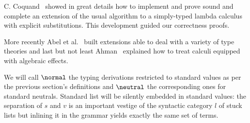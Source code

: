 C. Coquand~\cite{Coquand02} showed in great details how to implement and prove sound
and complete an extension of the usual algorithm to a simply-typed lambda calculus
with explicit substitutions. This development guided our correctness proofs.

More recently Abel et al.~\cite{NbeDep1, NbeDep2} built extensions able to deal with
a variety of type theories and last but not least Ahman~\cite{NbeEffects} explained
how to treat calculi equipped with algebraic effects.

\begin{remark}We will call $\normal$ the typing derivations restricted to standard
values as per the previous section's definitions and $\neutral$ the corresponding
ones for standard neutrals. Standard list will be silently embedded in standard
values: the separation of $s$ and $v$ is an important vestige of the syntactic
category $l$ of stuck lists but inlining it in the grammar yields exactly the
same set of terms.
\end{remark}

